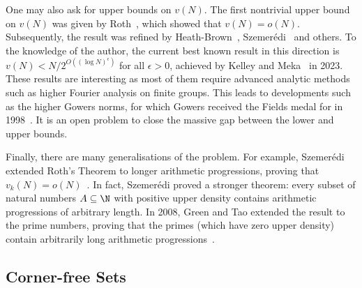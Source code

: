 One may also ask for upper bounds on \(v(N)\). The first nontrivial upper bound on \(v(N)\) was given by Roth~\cite{Roth1953}, which showed that \(v(N) = o(N)\). Subsequently, the result was refined by Heath-Brown~\cite{HeathBrown1987}, Szemerédi~\cite{Szemerédi1990} and others. To the knowledge of the author, the current best known result in this direction is \(v(N) < N / 2^{O((\log N)^{\epsilon})}\) for all \(\epsilon > 0\), achieved by Kelley and Meka~\cite{KelleyMeka2023} in 2023. These results are interesting as most of them require advanced analytic methods such as higher Fourier analysis on finite groups. This leads to developments such as the higher Gowers norms, for which Gowers received the Fields medal for in 1998~\cite{LLMM1999}. It is an open problem to close the massive gap between the lower and upper bounds.

Finally, there are many generalisations of the problem. For example, Szemerédi extended Roth's Theorem to longer arithmetic progressions, proving that \(v_k(N) = o(N)\)~\cite{Szemerédi1975}. In fact, Szemerédi proved a stronger theorem: every subset of natural numbers \(A \subseteq \N\) with positive upper density contains arithmetic progressions of arbitrary length. In 2008, Green and Tao extended the result to the prime numbers, proving that the primes (which have zero upper density) contain arbitrarily long arithmetic progressions~\cite{GreenTao2008}.

\subsection{Corner-free Sets}


